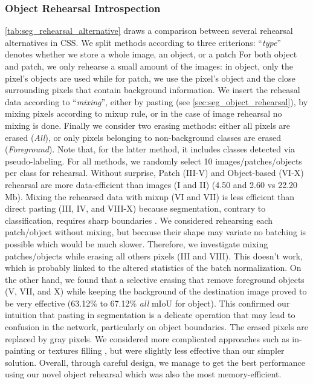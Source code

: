 \subsubsection{Object Rehearsal Introspection}

\autoref{tab:seg_rehearsal_alternative} draws a comparison between several rehearsal alternatives in
\ac{CSS}. We split methods according to three criterions: ``\textit{type}'' denotes whether we store a
whole image, an object, or a patch For both object and patch, we only rehearse a small amount of the
images: in object, only the pixel's objects are used while for patch, we use the pixel's object and
the close surrounding pixels that contain background information. We insert the reheasal data
according to ``\textit{mixing}'', either by pasting (see \autoref{sec:seg_object_rehearsal}), by
mixing pixels according to mixup \cite{hingyi2018mixup} rule, or in the case of image rehearsal no
mixing is done. Finally we consider two erasing methods: either all pixels are erased
(\textit{All}), or only pixels belonging to non-background classes are erased (\textit{Foreground}).
Note that, for the latter method, it includes classes detected via pseudo-labeling. For all methods,
we randomly select 10 images/patches/objects per class for rehearsal. Without surprise, Patch
(III-V) and Object-based (VI-X) rehearsal are more data-efficient than images (I and II) (4.50 and
2.60 vs 22.20 Mb). Mixing the rehearsed data with mixup (VI and VII) is less efficient than direct
pasting (III, IV, and VIII-X) because segmentation, contrary to classification, requires sharp
boundaries \cite{chen2020semeda}. We considered rehearsing each patch/object without mixing, but
because their shape may variate no batching is possible which would be much slower. Therefore, we
investigate mixing patches/objects while erasing all others pixels (III and VIII). This doesn't
work, which is probably linked to the altered statistics of the batch normalization. On the other
hand, we found that a selective erasing that remove foreground objects (V, VII, and X) while keeping
the background of the destination image proved to be very effective (63.12\% to 67.12\% \textit{all}
\ac{mIoU} for object). This confirmed our intuition that pasting in segmentation is a delicate
operation that may lead to confusion in the network, particularly on object boundaries. The erased
pixels are replaced by gray pixels. We considered more complicated approaches such as in-painting
\cite{fang2019instaboost} or textures filling \cite{mallikarjuna2006kth-tips}, but were slightly
less effective than our simpler solution. Overall, through careful design, we manage to get the best
performance using our novel object rehearsal which was also the most memory-efficient.

